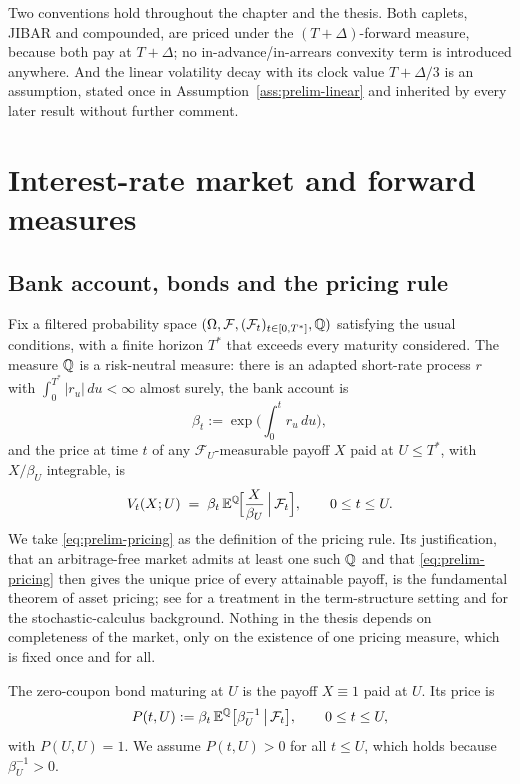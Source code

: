 \documentclass[../../../main.tex]{subfiles}
\begin{document}
Two conventions hold throughout the chapter and the thesis. Both caplets, JIBAR and compounded, are priced under the $(T+\Delta)$-forward measure, because both pay at $T+\Delta$; no in-advance/in-arrears convexity term is introduced anywhere. And the linear volatility decay with its clock value $T+\Delta/3$ is an assumption, stated once in Assumption~\ref{ass:prelim-linear} and inherited by every later result without further comment.

\section{Interest-rate market and forward measures}\label{sec:prelim-forward}

\subsection{Bank account, bonds and the pricing rule}

Fix a filtered probability space $(\Omega,\mathcal F,(\mathcal F_t)_{t\in[0,T^*]},\mathbb{Q})$ satisfying the usual conditions, with a finite horizon $T^*$ that exceeds every maturity considered. The measure $\mathbb{Q}$ is a risk-neutral measure: there is an adapted short-rate process $r$ with $\int_0^{T^*}|r_u|\,du<\infty$ almost surely, the bank account is
\[
\beta_t:=\exp\Big(\int_0^t r_u\,du\Big),
\]
and the price at time $t$ of any $\mathcal F_U$-measurable payoff $X$ paid at $U\le T^*$, with $X/\beta_U$ integrable, is
\begin{equation}\label{eq:prelim-pricing}
V_t(X;U)\;=\;\beta_t\,\mathbb{E}^{\mathbb{Q}}\!\Big[\frac{X}{\beta_U}\,\Big|\,\mathcal F_t\Big],\qquad 0\le t\le U .
\end{equation}
We take \eqref{eq:prelim-pricing} as the definition of the pricing rule. Its justification, that an arbitrage-free market admits at least one such $\mathbb{Q}$ and that \eqref{eq:prelim-pricing} then gives the unique price of every attainable payoff, is the fundamental theorem of asset pricing; see \cite[Ch.~4]{filipovic2009} for a treatment in the term-structure setting and \cite[Ch.~3]{karatzas1991} for the stochastic-calculus background. Nothing in the thesis depends on completeness of the market, only on the existence of one pricing measure, which is fixed once and for all.

\begin{definition}\label{def:prelim-bond}
The zero-coupon bond maturing at $U$ is the payoff $X\equiv1$ paid at $U$. Its price is
\[
P(t,U):=\beta_t\,\mathbb{E}^{\mathbb{Q}}\big[\beta_U^{-1}\,\big|\,\mathcal F_t\big],\qquad 0\le t\le U,
\]
with $P(U,U)=1$. We assume $P(t,U)>0$ for all $t\le U$, which holds because $\beta_U^{-1}>0$.
\end{definition}
\end{document}
